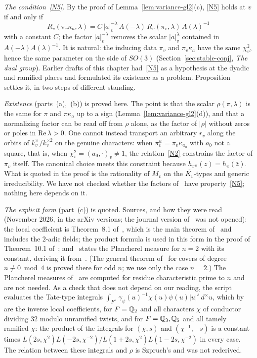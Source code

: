 \begin{remarkrev}\label{rem:N5}
\emph{The condition~\ref{N5}.} By the proof of
Lemma~\ref{lem:variance-gl2}(c), \ref{N5} holds at $v$ if and only if
\[
R_v(\pi_v\kappa_a,\lambda)=C\,|a|_v^{-\lambda}\,A(-\lambda)\,R_v(\pi_v,
\lambda)\,A(\lambda)^{-1}
\]
with a constant $C$; the factor $|a|_v^{-\lambda}$ removes the scalar
$|a|_v^{\lambda}$ contained in $A(-\lambda)A(\lambda)^{-1}$. It is natural:
the inducing data $\pi_v$ and $\pi_v\kappa_a$ have the same $\chi_v^2$,
hence the same parameter on the side of $SO(3)$
(Section~\ref{sec:stable-conj}, \emph{The dual group}). Earlier drafts of
this chapter had~\ref{N5} as a hypothesis at the dyadic and ramified
places and formulated its existence as a problem. Proposition~\normref{}
settles it, in two steps of different standing.

\emph{Existence} (parts~(a),~(b)) is proved here. The point is that the
scalar $\rho(\pi,\lambda)$ is the same for $\pi$ and $\pi\kappa_a$ up to a
sign (Lemma~\ref{lem:variance-gl2}(d)), and that a normalizing factor can
be read off from $\rho$ alone, as the factor of $|\rho|$ without zeros or
poles in $\mathrm{Re}\,\lambda>0$. One cannot instead transport an
arbitrary $r_v$ along the orbits of $k_v^\times/k_v^{\times2}$ on the
genuine characters: when $\pi_v^w=\pi_v\kappa_{a_0}$ with $a_0$ not a
square, that is, when $\chi_v^2=(a_0,\cdot)_v\ne1$, the
relation~\ref{N2} constrains the factor of $\pi_v$ itself. The canonical
choice meets this constraint because $h_{\pi^w}(z)=\overline{h_\pi(\bar
z)}$. What is quoted in the proof is the rationality of $M_v$ on the
$\overline{K_v}$-types and generic irreducibility. We have not checked
whether the factors of~\cite{Li12a} have property~\ref{N5}; nothing here
depends on it.

\emph{The explicit form} (part~(c)) is quoted. Sources, and how they were
read (November 2026, in the arXiv versions; the journal version
of~\cite{Sz09} was not opened): the local coefficient is Theorem~8.1
of~\cite{Sz10}, which is the main theorem of~\cite{Sz09} and includes the
$2$-adic fields; the product formula is used in this form in the proof of
Theorem~10.1 of~\cite{Sz10}; and~\cite[(5.8)]{Sz16} states the Plancherel
measure for $n=2$ with its constant, deriving it from~\cite{Sz09}. (The
general theorem of~\cite{Sz16} for covers of degree $n\not\equiv0\bmod4$
is proved there for odd $n$; we use only the case $n=2$.)
The Plancherel measures of~\cite{GS16} are computed for residue
characteristic prime to $n$ and are not needed. As a check that does
not depend on our reading, the script evaluates the Tate-type integrals
$\int_{F^\times}\gamma_\psi(u)^{-1}\chi(u)\psi(u)|u|^s\,d^\times u$, which
by~\cite{Sz09} are the inverse local coefficients, for $F=\mathbb{Q}_2$ and all
characters $\chi$ of conductor dividing $32$ modulo unramified twists, and
for $F=\mathbb{Q}_3,\mathbb{Q}_5$ and all tamely ramified $\chi$: the product of the
integrals for $(\chi,s)$ and $(\chi^{-1},-s)$ is a constant times
$L(2s,\chi^2)L(-2s,\chi^{-2})/L(1+2s,\chi^2)L(1-2s,\chi^{-2})$ in every
case. The relation between these integrals and $\rho$ is Szpruch's and
was not rederived.


\end{remarkrev}
